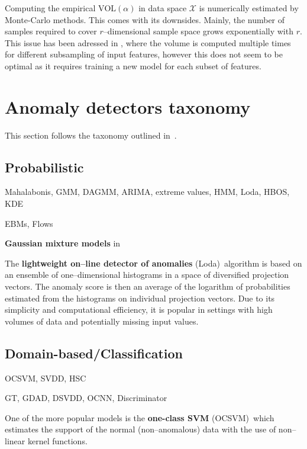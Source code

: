 Computing the empirical $\text{VOL}(\alpha)$ in data space $\mathcal{X}$ is numerically estimated by Monte-Carlo methods. This comes with its downsides. Mainly, the number of samples required to cover $r$--dimensional sample space grows exponentially with $r$. This issue has been adressed in \cite{goix2016evaluate}, where the volume is computed multiple times for different subsampling of input features, however this does not seem to be optimal as it requires training a new model for each subset of features.


\section{Anomaly detectors taxonomy}

This section follows the taxonomy outlined in~\cite{pimentel2014review, ruff2020unifying}.


\subsection{Probabilistic}

Mahalabonis, GMM, DAGMM, ARIMA, extreme values, HMM, Loda, HBOS, KDE

EBMs, Flows

\textbf{Gaussian mixture models} in\,\cite{mahadevan2010anomaly}


The \textbf{lightweight on--line detector of anomalies} (Loda)\,\cite{pevny2016loda}
algorithm is based on an ensemble of one--dimensional histograms
in a space of diversified projection vectors. The anomaly score is
then an average of the logarithm of probabilities estimated from the
histograms on individual projection vectors. Due to its simplicity
and computational efficiency, it is popular in settings with high
volumes of data and potentially missing input values.


\subsection{Domain-based/Classification}

OCSVM, SVDD, HSC

GT, GDAD, DSVDD, OCNN, Discriminator

One of the more popular models is the \textbf{one-class SVM} (OCSVM)\,\cite{scholkopf2001estimating}
which estimates the support of the normal (non--anomalous) data with
the use of non--linear kernel functions.

